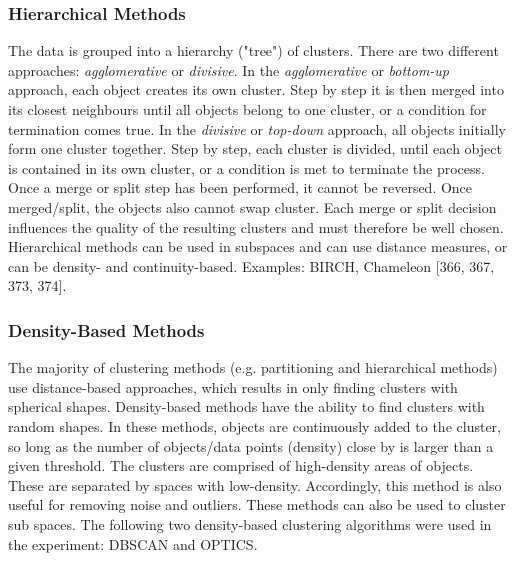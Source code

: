   \subsubsection{Hierarchical Methods}
  The data is grouped into a hierarchy ("tree") of clusters. There are two different approaches: \textit{agglomerative} or \textit{divisive}. In the \textit{agglomerative} or \textit{bottom-up} approach, each object creates its own cluster. Step by step it is then merged into its closest neighbours until all objects belong to one cluster, or a condition for termination comes true. In the \textit{divisive} or \textit{top-down} approach, all objects initially form one cluster together. Step by step, each cluster is divided, until each object is contained in its own cluster, or a condition is met to terminate the process. Once a merge or split step has been performed, it cannot be reversed. Once merged/split, the objects also cannot swap cluster. Each merge or split decision influences the quality of the resulting clusters and must therefore be well chosen. Hierarchical methods can be used in subspaces and can use distance measures, or can be density- and continuity-based. Examples: BIRCH, Chameleon \autocite{han2011data}[366, 367, 373, 374].


  \subsubsection{Density-Based Methods}
  \label{section:densityBasedMethods}
  The majority of clustering methods (e.g. partitioning and hierarchical methods) use distance-based approaches, which results in only finding clusters with spherical shapes. Density-based methods have the ability to find clusters with random shapes. In these methods, objects are continuously added to the cluster, so long as the number of objects/data points (density) close by is larger than a given threshold. The clusters are comprised of high-density areas of objects. These are separated by spaces with low-density. Accordingly, this method is also useful for removing noise and outliers. These methods can also be used to cluster sub spaces. The following two density-based clustering algorithms were used in the experiment: DBSCAN and OPTICS.




